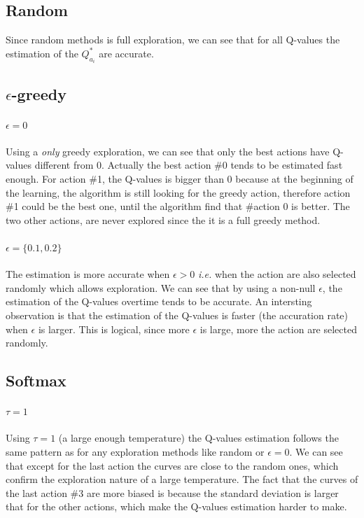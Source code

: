 \documentclass[letterpaper]{article}
\begin{document}
\subsection*{Random}

Since random methods is full exploration, we can see that for all Q-values
the estimation of the $Q^*_{a_i}$ are accurate.


\subsection*{$\epsilon$-greedy}

\paragraph{$\epsilon = 0$} Using a \textit{only} greedy exploration, we
can see that only the best actions have Q-values different from 0. Actually
the best action \#0 tends to be estimated fast enough. For action \#1, the
Q-values is bigger than 0 because at the beginning of the learning, the
algorithm is still looking for the greedy action, therefore action \#1
could be the best one, until the algorithm find that \#action 0 is better.
The two other actions, are never explored since the it is a full greedy
method.

\paragraph{$\epsilon = \{0.1, 0.2\}$}

The estimation is more accurate when $\epsilon > 0$ \textit{i.e.} when
the action are also selected randomly which allows exploration. We can see
that by using a non-null $\epsilon$, the estimation of the Q-values overtime
tends to be accurate. An intersting observation is that the estimation
of the Q-values is faster (the accuration rate)
when $\epsilon$ is larger. This is logical,
since more $\epsilon$ is large, more the action are selected randomly.

\subsection*{Softmax}

\paragraph{$\tau = 1$} Using $\tau = 1$ (a large enough temperature)
the Q-values estimation follows the same pattern as for any exploration methods
like random or $\epsilon = 0$. We can see that except for the last action
the curves are close to the random ones,
which confirm the exploration nature of a large temperature.
The fact that the curves of
the last action \#3 are more biased is because the standard deviation
is larger that for the other actions, which make the Q-values estimation
harder to make.
\end{document}
